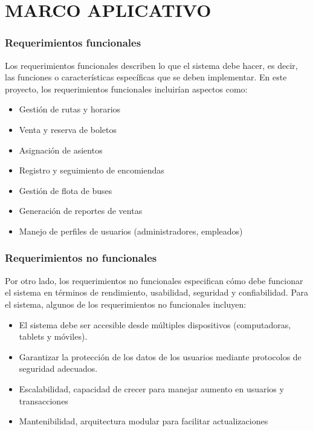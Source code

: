 \chapter{MARCO APLICATIVO}
\subsection{Requerimientos funcionales}
Los requerimientos funcionales describen lo que el sistema debe hacer, es decir, las funciones o características específicas que se deben implementar. En este proyecto, los requerimientos funcionales incluirían aspectos como:
\begin{itemize}[label=$\bullet$, left=0cm, labelsep = 1.05cm, topsep = 0pt, parsep = 0pt]
	\item Gestión de rutas y horarios
	\item Venta y reserva de boletos
	\item Asignación de asientos
	\item Registro y seguimiento de encomiendas
	\item Gestión de flota de buses
	\item Generación de reportes de ventas
	\item Manejo de perfiles de usuarios (administradores, empleados)
\end{itemize}
\subsection{Requerimientos no funcionales}
Por otro lado, los requerimientos no funcionales especifican cómo debe funcionar el sistema en términos de rendimiento, usabilidad, seguridad y confiabilidad. Para el sistema, algunos de los requerimientos no funcionales incluyen:
\begin{itemize}[label=$\bullet$, left=0cm, labelsep = 1.05cm, topsep = 0pt, parsep = 0pt]
	\item El sistema debe ser accesible desde múltiples dispositivos (computadoras, tablets y móviles).
	\item Garantizar la protección de los datos de los usuarios mediante protocolos de seguridad adecuados.
	\item Escalabilidad, capacidad de crecer para manejar aumento en usuarios y transacciones
	\item Mantenibilidad, arquitectura modular para facilitar actualizaciones
\end{itemize}